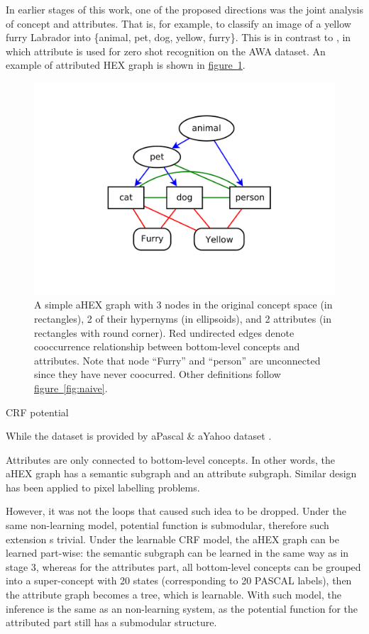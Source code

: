 \documentclass[11pt,a4paper]{book}
\begin{document}
In earlier stages of this work, one of the proposed directions was the joint analysis of concept and attributes. That is, for example, to classify an image of a yellow furry Labrador into \{animal, pet, dog, yellow, furry\}. This is in contrast to \cite{deng2014large, ding2015probabilistic}, in which attribute is used for zero shot recognition on the AWA dataset. An example of attributed HEX graph is shown in \hyperref[fig:ahex]{figure~\ref{fig:ahex}}.
\begin{figure}[htbp]
\centering
\includegraphics[scale=0.5]{ahex.pdf}
\caption{A simple aHEX graph with 3 nodes in the original concept space (in rectangles), 2 of their hypernyms (in ellipsoids), and 2 attributes (in rectangles with round corner). Red undirected edges denote cooccurrence relationship between bottom-level concepts and attributes. Note that node ``Furry'' and ``person'' are unconnected since they have never coocurred. Other definitions follow \hyperref[fig:naive]{figure~\ref{fig:naive}}.}
\label{fig:ahex}
\end{figure}

CRF potential

While the dataset is provided by aPascal \& aYahoo dataset \cite{farhadi2009describing}. 

Attributes are only connected to bottom-level concepts. In other words, the aHEX graph has a semantic subgraph and an attribute subgraph. Similar design has been applied to pixel labelling problems.

However, it was not the loops that caused such idea to be dropped. Under the same non-learning model, potential function is submodular, therefore such extension s trivial. Under the learnable CRF model, the aHEX graph can be learned part-wise: the semantic subgraph can be learned in the same way as in stage 3, whereas for the attributes part, all bottom-level concepts can be grouped into a super-concept with 20 states (corresponding to 20 PASCAL labels), then the attribute graph becomes a tree, which is learnable. With such model, the inference is the same as an non-learning system, as the potential function for the attributed part still has a submodular structure.

\clearpage


\end{document}
